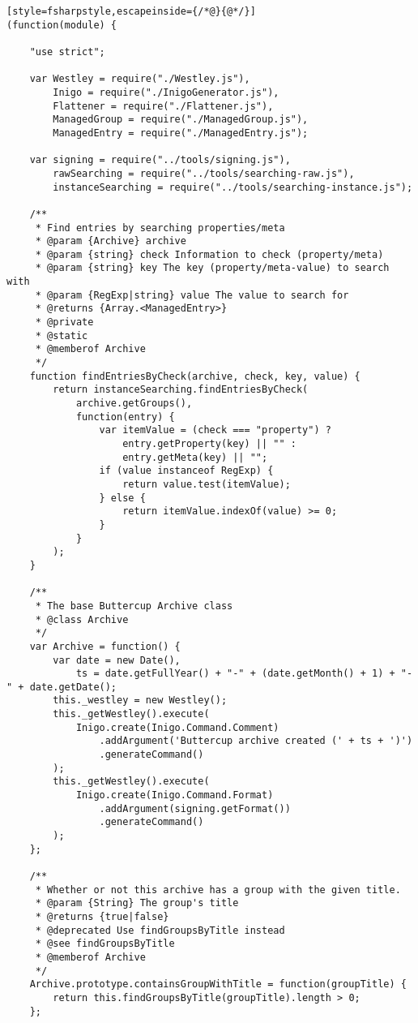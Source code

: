 
\begin{lstlisting}[style=fsharpstyle,escapeinside={/*@}{@*/}]
(function(module) {

    "use strict";

    var Westley = require("./Westley.js"),
        Inigo = require("./InigoGenerator.js"),
        Flattener = require("./Flattener.js"),
        ManagedGroup = require("./ManagedGroup.js"),
        ManagedEntry = require("./ManagedEntry.js");

    var signing = require("../tools/signing.js"),
        rawSearching = require("../tools/searching-raw.js"),
        instanceSearching = require("../tools/searching-instance.js");

    /**
     * Find entries by searching properties/meta
     * @param {Archive} archive
     * @param {string} check Information to check (property/meta)
     * @param {string} key The key (property/meta-value) to search with
     * @param {RegExp|string} value The value to search for
     * @returns {Array.<ManagedEntry>}
     * @private
     * @static
     * @memberof Archive
     */
    function findEntriesByCheck(archive, check, key, value) {
        return instanceSearching.findEntriesByCheck(
            archive.getGroups(),
            function(entry) {
                var itemValue = (check === "property") ?
                    entry.getProperty(key) || "" :
                    entry.getMeta(key) || "";
                if (value instanceof RegExp) {
                    return value.test(itemValue);
                } else {
                    return itemValue.indexOf(value) >= 0;
                }
            }
        );
    }

    /**
     * The base Buttercup Archive class
     * @class Archive
     */
    var Archive = function() {
        var date = new Date(),
            ts = date.getFullYear() + "-" + (date.getMonth() + 1) + "-" + date.getDate();
        this._westley = new Westley();
        this._getWestley().execute(
            Inigo.create(Inigo.Command.Comment)
                .addArgument('Buttercup archive created (' + ts + ')')
                .generateCommand()
        );
        this._getWestley().execute(
            Inigo.create(Inigo.Command.Format)
                .addArgument(signing.getFormat())
                .generateCommand()
        );
    };

    /**
     * Whether or not this archive has a group with the given title.
     * @param {String} The group's title
     * @returns {true|false}
     * @deprecated Use findGroupsByTitle instead
     * @see findGroupsByTitle
     * @memberof Archive
     */
    Archive.prototype.containsGroupWithTitle = function(groupTitle) {
        return this.findGroupsByTitle(groupTitle).length > 0;
    };


\end{lstlisting}
